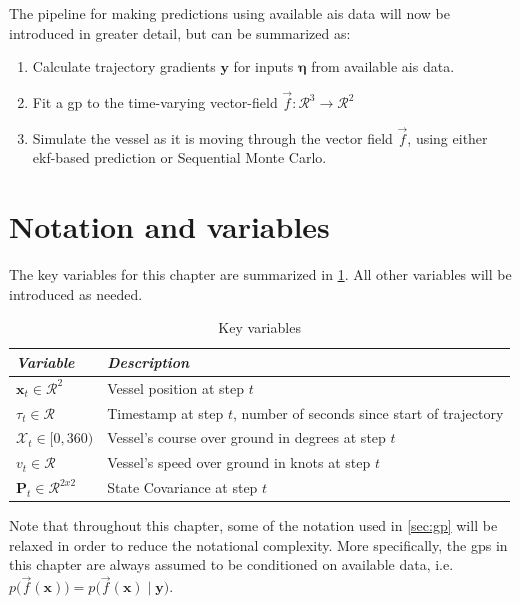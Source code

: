 The pipeline for making predictions using available \acrshort{ais} data will now be introduced in greater detail, but can be summarized as:
\begin{enumerate}
    \item Calculate trajectory gradients $\boldsymbol{y}$ for inputs $\boldsymbol{\eta}$ from available \acrshort{ais} data.
    \item Fit a \acrshort{gp} to the time-varying vector-field $\vec{f}: \mathcal{R}^3 \to \mathcal{R}^2$
    \item Simulate the vessel as it is moving through the vector field $\vec{f}$, using either \acrshort{ekf}-based prediction or Sequential Monte Carlo.
\end{enumerate}



\section{Notation and variables}
The key variables for this chapter are summarized in \cref{table:dyngp_key_variables}. All other variables will be introduced as needed.
\begin{table}[h]
    \centering
    \begin{tabular}{ll}
        \textit{\textbf{Variable}}               & \textit{\textbf{Description}}                                      \\ \hline
        $\boldsymbol{x}_t \in \mathcal{R}^2$     & Vessel position at step $t$                                        \\
        $\tau_t \in \mathcal{R}$                 & Timestamp at step $t$, number of seconds since start of trajectory \\
        $\mathcal{X}_t \in [0, 360)$             & Vessel's course over ground in degrees at step $t$                 \\
        $v_t \in \mathcal{R}$                    & Vessel's speed over ground in knots at step $t$                    \\
        $\boldsymbol{P}_t \in \mathcal{R}^{2x2}$ & State Covariance at step $t$                                       \\
    \end{tabular}
    \caption{Key variables}
    \label{table:dyngp_key_variables}
\end{table}

Note that throughout this chapter, some of the notation used in \cref{sec:gp} will be relaxed in order to reduce the notational complexity. More specifically, the \acrshort{gp}s in this chapter are always assumed to be conditioned on available data, i.e. $p\big(\vec{f}(\boldsymbol{x})\big) = p\big(\vec{f}(\boldsymbol{x}) \; | \; \boldsymbol{y} \big)$.

